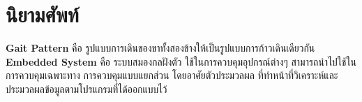\section{นิยามศัพท์}
{
	\textbf{Gait Pattern}
	คือ รูปแบบการเดินของขาทั้งสองข้างให้เป็นรูปแบบการก้าวเดินเดียวกัน \\
	\textbf{Embedded System}
	คือ ระบบสมองกลฝังตัว ใช้ในการควบคุมอุปกรณ์ต่างๆ สามารถนำไปใช้ในการควบคุมเฉพาะทาง
	การควบคุมแบบแยกส่วน โดยอาศัยตัวประมวลผล ที่ทำหน้าที่วิเคราะห์และประมวลผลข้อมูลตามโปรแกรมที่ได้ออกแบบไว้
}

